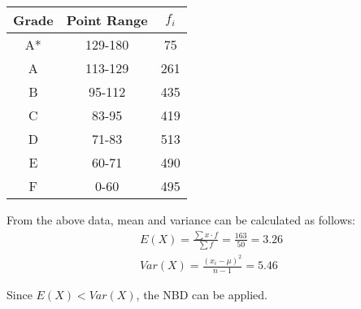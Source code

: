 \documentclass{article}
\begin{document}
\begin{center}
  \begin{tabular}{|c|c|c|}
    \hline
    \textbf{Grade} & \textbf{Point Range} & \textbf{$f_i$} \\ %
    \hline
    \hline
    A* & 129-180	& 75	\\ %
    A  & 113-129	& 261	\\ %
    B  & 95-112	  & 435	\\ %
    C  & 83-95	  & 419	\\ %
    D  & 71-83	  & 513	\\ %
    E  & 60-71	  & 490	\\ %
    F  & 0-60	    & 495	\\ %
    \hline
  \end{tabular}
\end{center}

From the above data, mean and variance can be calculated as follows:
\begin{gather*}
  E(X) = \frac{\sum x \cdot f}{\sum f} = \frac{163}{50} = 3.26 \\[5pt]
  Var(X) = \frac{(x_i - \mu)^2}{n - 1} = 5.46 
\end{gather*}

Since $ E(X) < Var(X) $, the NBD can be applied. \\


\end{document}
